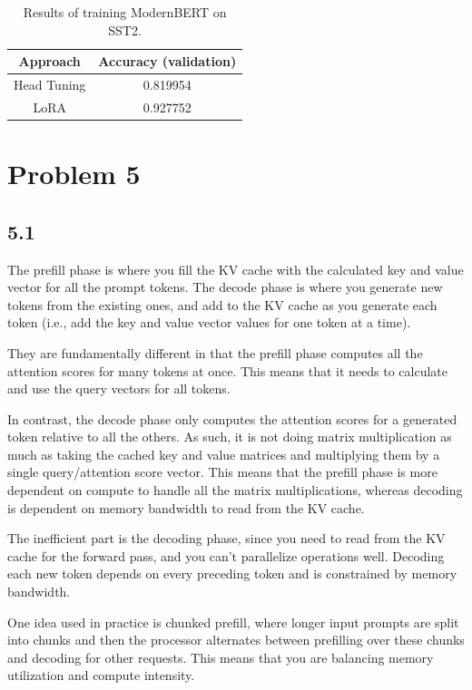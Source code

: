 \documentclass{article}
\begin{document}
\begin{table}[H]
    \centering
    \begin{tabular}{cc}
        \toprule
        Approach    & Accuracy (validation) \\
        \midrule
        Head Tuning & 0.819954              \\
        LoRA        & 0.927752              \\
        \bottomrule
    \end{tabular}
    \caption{Results of training ModernBERT on SST2.}
    \label{tab1}
\end{table}

\section*{Problem 5}

\subsection*{5.1}

The prefill phase is where you fill the KV cache with the calculated key and value vector for all the prompt tokens. The decode phase is where you generate new tokens from the existing ones, and add to the KV cache as you generate each token (i.e., add the key and value vector values for one token at a time). 

They are fundamentally different in that the prefill phase computes all the attention scores for many tokens at once. This means that it needs to calculate and use the query vectors for all tokens.

In contrast, the decode phase only computes the attention scores for a generated token relative to all the others. As such, it is not doing matrix multiplication as much as taking the cached key and value matrices and multiplying them by a single query/attention score vector. This means that the prefill phase is more dependent on compute to handle all the matrix multiplications, whereas decoding is dependent on memory bandwidth to read from the KV cache.

The inefficient part is the decoding phase, since you need to read from the KV cache for the forward pass, and you can't parallelize operations well. Decoding each new token depends on every preceding token and is constrained by memory bandwidth.

One idea used in practice is chunked prefill, where longer input prompts are split into chunks and then the processor alternates between prefilling over these chunks and decoding for other requests. This means that you are balancing memory utilization and compute intensity.
\end{document}
